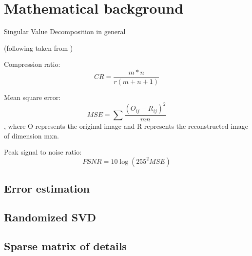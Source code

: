 \section{Mathematical background}
\label{section:math}

Singular Value Decomposition in general

(following taken from \cite{SairaBanu2015})

Compression ratio:
$$CR=\frac{m*n}{r(m+n+1)}$$

Mean square error:
$$MSE=\sum \frac{(O_{ij} - R_{ij})^{2}}{mn}$$,
where O represents the original image and R represents the
reconstructed image of dimension mxn.

Peak signal to noise ratio:
$$PSNR=10\log({255}^{2}MSE)$$

\subsection{Error estimation}

\subsection{Randomized SVD}

\subsection{Sparse matrix of details}